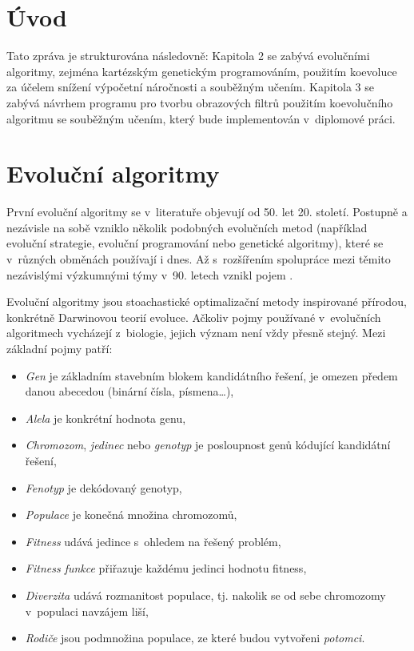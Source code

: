
\chapter{Úvod}

\blind


Tato zpráva je strukturována následovně: Kapitola 2 se zabývá evolučními algoritmy, zejména kartézským genetickým programováním, použitím koevoluce za účelem snížení výpočetní náročnosti a souběžným učením. Kapitola 3 se zabývá návrhem programu pro tvorbu obrazových filtrů použitím koevolučního algoritmu se souběžným učením, který bude implementován v~diplomové práci.

\chapter{Evoluční algoritmy}

První evoluční algoritmy se v~literatuře objevují od 50. let 20. století. Postupně a nezávisle na sobě vzniklo několik podobných evolučních metod (například evoluční strategie, evoluční programování nebo genetické algoritmy), které se v~různých obměnách používají i dnes. Až s~rozšířením spolupráce mezi těmito nezávislými výzkumnými týmy v~90. letech vznikl pojem .

Evoluční algoritmy jsou stoachastické optimalizační metody inspirované přírodou, konkrétně Darwinovou teorií evoluce. Ačkoliv pojmy používané v~evolučních algoritmech vycházejí z~biologie, jejich význam není vždy přesně stejný. Mezi základní pojmy patří:

\begin{itemize}
    \item\emph{Gen} je základním stavebním blokem kandidátního řešení, je omezen předem danou abecedou (binární čísla, písmena\ldots),
    \item\emph{Alela} je konkrétní hodnota genu,
    \item\emph{Chromozom}, \emph{jedinec} nebo \emph{genotyp} je posloupnost genů kódující kandidátní řešení,
    \item\emph{Fenotyp} je dekódovaný genotyp,
    \item\emph{Populace} je konečná množina chromozomů,
    \item\emph{Fitness} udává  jedince s~ohledem na řešený problém,
    \item\emph{Fitness funkce} přiřazuje každému jedinci hodnotu fitness,
    \item\emph{Diverzita} udává rozmanitost populace, tj. nakolik se od sebe chromozomy v~populaci navzájem liší,
    \item\emph{Rodiče} jsou podmnožina populace, ze které budou vytvořeni \emph{potomci}.
\end{itemize}

